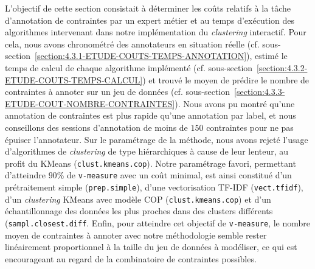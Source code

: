 			L'objectif de cette section consistait à déterminer les coûts relatifs à la tâche d'annotation de contraintes par un expert métier et au temps d'exécution des algorithmes intervenant dans notre implémentation du \textit{clustering} interactif.
			Pour cela, nous avons chronométré des annotateurs en situation réelle (cf. sous-section~\ref{section:4.3.1-ETUDE-COUTS-TEMPS-ANNOTATION}), estimé le temps de calcul de chaque algorithme implémenté (cf. sous-section~\ref{section:4.3.2-ETUDE-COUTS-TEMPS-CALCUL}) et trouvé le moyen de prédire le nombre de contraintes à annoter sur un jeu de données (cf. sous-section~\ref{section:4.3.3-ETUDE-COUT-NOMBRE-CONTRAINTES}).
			Nous avons pu montré qu'une annotation de contraintes est plus rapide qu'une annotation par label, et nous conseillons des sessions d'annotation de moins de $150$ contraintes pour ne pas épuiser l'annotateur.
			Sur le paramétrage de la méthode, nous avons rejeté l'usage d'algorithmes de \textit{clustering} de type hiérarchiques à cause de leur lenteur, au profit du KMeans (\texttt{clust.kmeans.cop}).
			Notre paramétrage favori, permettant d'atteindre $90$\% de \texttt{v-measure} avec un coût minimal, est ainsi constitué d'un prétraitement simple (\texttt{prep.simple}), d'une vectorisation TF-IDF (\texttt{vect.tfidf}), d'un \textit{clustering} KMeans avec modèle COP (\texttt{clust.kmeans.cop}) et d'un échantillonnage des données les plus proches dans des clusters différents (\texttt{sampl.closest.diff}.
			Enfin, pour atteindre cet objectif de \texttt{v-measure}, le nombre moyen de contraintes à annoter avec notre méthodologie semble rester linéairement proportionnel à la taille du jeu de données à modéliser, ce qui est encourageant au regard de la combinatoire de contraintes possibles.
			
